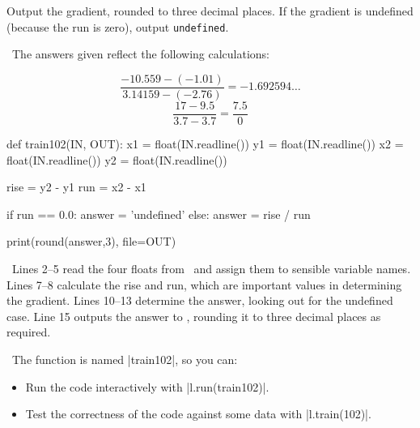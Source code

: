 Output the gradient, rounded to three decimal places.  If the gradient is undefined
(because the run is zero), output \texttt{undefined}.

\Sample

               {}
               {}

\Explanation\ The answers given reflect the following calculations:

\vspace{-5mm}
\minipagesthree{\[\frac{3.5-1}{10-5} = 2.5\]}
               {\[\frac{-10.559 - (-1.01)}{3.14159 - (-2.76)} = -1.692594\ldots\]}
               {\[\frac{17 - 9.5}{3.7 - 3.7} = \frac{7.5}{0}\]}


\Solution

\begin{pythoncode} 
  def train102(IN, OUT):
    x1 = float(IN.readline())
    y1 = float(IN.readline())
    x2 = float(IN.readline())
    y2 = float(IN.readline())

    rise = y2 - y1
    run  = x2 - x1

    if run == 0.0:
      answer = 'undefined'
    else:
      answer = rise / run

    print(round(answer,3), file=OUT)
\end{pythoncode}

\Explanation\ Lines 2--5 read the four floats from \IN\ and assign them to sensible
variable names. Lines 7--8 calculate the rise and run, which are important values in
determining the gradient. Lines 10--13 determine the answer, looking out for the undefined
case. Line 15 outputs the answer to \OUT, rounding it to three decimal places as required.

\Running\ The function is named \pycode|train102|, so you can:
\begin{itemize}
  \item Run the code interactively with \pycode|l.run(train102)|.
  \item Test the correctness of the code against some data with \pycode|l.train(102)|.
\end{itemize}
